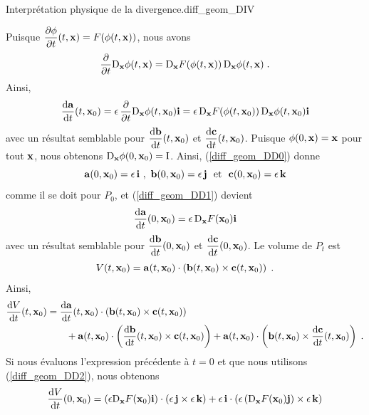 {
{Interprétation physique de la divergence.}{diff_geom_DIV}

Puisque $\displaystyle \pdydx{\phi}{t}(t,\VEC{x}) = F(\phi(t,\VEC{x}))$,
nous avons
\[
\pdfdx{ \diff_{\VEC{x}} \phi(t,\VEC{x}) }{t}
= \diff_{\VEC{x}} F(\phi(t,\VEC{x})) \, \diff_{\VEC{x}}
\phi(t,\VEC{x}) \; .
\]
Ainsi,
\begin{equation} \label{diff_geom_DD1}
\dydx{\VEC{a}}{t}(t,\VEC{x}_0) = \epsilon\, \pdfdx{
\diff_{\VEC{x}} \phi(t,\VEC{x}_0)}{t} \ii
= \epsilon\,
\diff_{\VEC{x}} F(\phi(t,\VEC{x}_0)) \, \diff_{\VEC{x}}
\phi(t,\VEC{x}_0) \ii
\end{equation}
avec un résultat semblable pour
$\displaystyle \dydx{\VEC{b}}{t}(t,\VEC{x}_0)$ et
$\displaystyle \dydx{\VEC{c}}{t}(t,\VEC{x}_0)$.
Puisque $\phi(0,\VEC{x}) = \VEC{x}$ pour tout $\VEC{x}$, nous obtenons
$\diff_{\VEC{x}} \phi(0,\VEC{x}_0) = \Id$. Ainsi, (\ref{diff_geom_DD0})
donne
\[
  \VEC{a}(0,\VEC{x}_0) = \epsilon\, \ii \ ,
  \ \VEC{b}(0,\VEC{x}_0) = \epsilon\, \jj
\ \text{ et }\ \VEC{c}(0,\VEC{x}_0) = \epsilon\, \kk
\]
comme il se doit pour $P_0$, et (\ref{diff_geom_DD1}) devient
\begin{equation} \label{diff_geom_DD2}
\dydx{\VEC{a}}{t}(0,\VEC{x}_0) = \epsilon\, \diff_{\VEC{x}}
F(\VEC{x}_0) \ii
\end{equation}
avec un résultat semblable pour
$\displaystyle \dydx{\VEC{b}}{t}(0,\VEC{x}_0)$ et
$\displaystyle \dydx{\VEC{c}}{t}(0,\VEC{x}_0)$.  Le volume de $P_t$ est
\[
V(t,\VEC{x}_0) = \VEC{a}(t,\VEC{x}_0) \cdot \left(\VEC{b}(t,\VEC{x}_0) \times
\VEC{c}(t,\VEC{x}_0) \right) \; .
\]
Ainsi,
\begin{align*}
\dydx{V}{t}(t,\VEC{x}_0) &=
\dydx{\VEC{a}}{t}(t,\VEC{x}_0) \cdot \left(\VEC{b}(t,\VEC{x}_0) \times
\VEC{c}(t,\VEC{x}_0) \right) \\
& \qquad
  + \VEC{a}(t,\VEC{x}_0) \cdot \left(\dydx{\VEC{b}}{t}(t,\VEC{x}_0) \times
\VEC{c}(t,\VEC{x}_0) \right)
+ \VEC{a}(t,\VEC{x}_0) \cdot \left(\VEC{b}(t,\VEC{x}_0) \times
\dydx{\VEC{c}}{t}(t,\VEC{x}_0) \right) \; .
\end{align*}
Si nous évaluons l'expression précédente à $t=0$ et que nous utilisons
(\ref{diff_geom_DD2}), nous obtenons
\begin{align*}
\dydx{V}{t}(0,\VEC{x}_0) &=
\left(\epsilon \diff_{\VEC{x}} F(\VEC{x}_0) \ii \right)
\cdot \left(\epsilon\, \jj \times \epsilon\, \kk \right)
+ \epsilon\, \ii \cdot \left(\epsilon
\left(\diff_{\VEC{x}} F(\VEC{x}_0)\jj \right)
\times \epsilon\,\kk \right) \\

\end{align*}}
